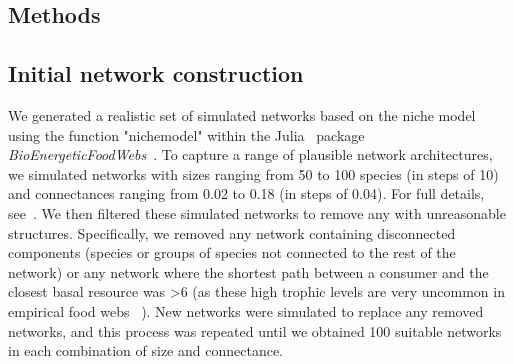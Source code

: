 \documentclass[12pt]{article}
\begin{document}
\begin{spacing}{2.0}
    


    	
\section*{Methods}

	\subsection*{Initial network construction}

		We generated a realistic set of simulated networks based on the niche model~\citep{Williams2000,Stouffer2007} using the function "nichemodel" within the Julia~\citep{Julia} package \emph{BioEnergeticFoodWebs}~\citep{bioenergfw,Delmas2017}. 
		To capture a range of plausible network architectures, we simulated networks with sizes ranging from 50 to 100 species (in steps of 10) and connectances ranging from 0.02 to 0.18 (in steps of 0.04). 
		For full details, see~\citet{Cirtwill2021_inprep}.
        We then filtered these simulated networks to remove any with unreasonable structures.
		Specifically, we removed any network containing disconnected components (species or groups of species not connected to the rest of the network) or any network where the shortest path between a consumer and the closest basal resource was \textgreater6 (as these high trophic levels are very uncommon in empirical food webs ~\citep{}).
		New networks were simulated to replace any removed networks, and this process was repeated until we obtained 100 suitable networks in each combination of size and connectance.
              

\end{spacing}
\end{document}
